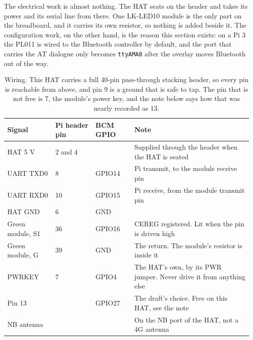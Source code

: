 The electrical work is almost nothing. The HAT seats on the header and takes its power and its serial line from there. One LK-LED10 module is the only part on the breadboard, and it carries its own resistor, so nothing is added beside it. The configuration work, on the other hand, is the reason this section exists: on a Pi 3 the PL011 is wired to the Bluetooth controller by default, and the port that carries the AT dialogue only becomes \texttt{ttyAMA0} after the overlay moves Bluetooth out of the way.


\begin{table}[H]\centering\small
\begin{tabular}{p{40mm}p{24mm}p{22mm}p{62mm}}
\toprule
Signal & Pi header pin & BCM GPIO & Note \\
\midrule
HAT 5 V & 2 and 4 & & Supplied through the header when the HAT is seated \\
UART TXD0 & 8 & GPIO14 & Pi transmit, to the module receive pin \\
UART RXD0 & 10 & GPIO15 & Pi receive, from the module transmit pin \\
HAT GND & 6 & GND & \\
Green module, S1 & 36 & GPIO16 & CEREG registered. Lit when the pin is driven high \\
Green module, G & 39 & GND & The return. The module's resistor is inside it \\
PWRKEY & 7 & GPIO4 & The HAT's own, by its PWR jumper. Never drive it from anything else \\
Pin 13 & & GPIO27 & The draft's choice. Free on this HAT, see the note \\
NB antenna & & & On the NB port of the HAT, not a 4G antenna \\
\bottomrule
\end{tabular}
\caption{Wiring. This HAT carries a full 40-pin pass-through stacking header, so every pin is reachable from above, and pin 9 is a ground that is safe to tap. The pin that is not free is 7, the module's power key, and the note below says how that was nearly recorded as 13.}
\end{table}

